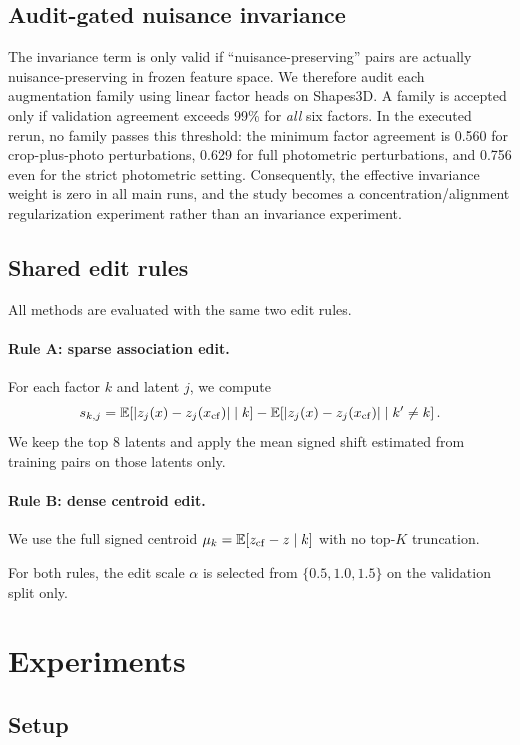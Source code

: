 \subsection{Audit-gated nuisance invariance}

The invariance term is only valid if ``nuisance-preserving'' pairs are actually nuisance-preserving in frozen feature space. We therefore audit each augmentation family using linear factor heads on Shapes3D. A family is accepted only if validation agreement exceeds 99\% for \emph{all} six factors. In the executed rerun, no family passes this threshold: the minimum factor agreement is 0.560 for crop-plus-photo perturbations, 0.629 for full photometric perturbations, and 0.756 even for the strict photometric setting. Consequently, the effective invariance weight is zero in all main runs, and the study becomes a concentration/alignment regularization experiment rather than an invariance experiment.

\subsection{Shared edit rules}

All methods are evaluated with the same two edit rules.

\paragraph{Rule A: sparse association edit.}
For each factor $k$ and latent $j$, we compute
\[
s_{k,j} = \mathbb{E}\!\left[|z_j(x)-z_j(x_{\mathrm{cf}})| \mid k\right]
- \mathbb{E}\!\left[|z_j(x)-z_j(x_{\mathrm{cf}})| \mid k' \neq k\right].
\]
We keep the top 8 latents and apply the mean signed shift estimated from training pairs on those latents only.

\paragraph{Rule B: dense centroid edit.}
We use the full signed centroid $\mu_k = \mathbb{E}[z_{\mathrm{cf}}-z \mid k]$ with no top-$K$ truncation.

For both rules, the edit scale $\alpha$ is selected from $\{0.5, 1.0, 1.5\}$ on the validation split only.

\section{Experiments}
\label{sec:experiments}

\subsection{Setup}

